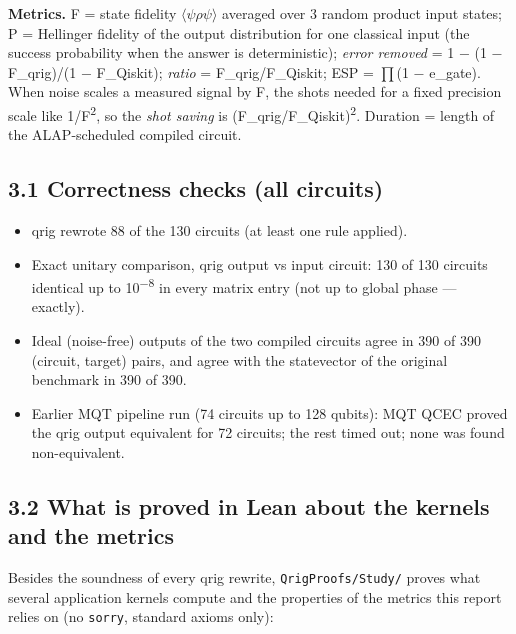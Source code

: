 \documentclass[
  10pt,
]{article}
\newcounter{none} %
\providecommand{\tightlist}{%
  \setlength{\itemsep}{0pt}\setlength{\parskip}{0pt}}
\begin{document}
\textbf{Metrics.} F = state fidelity \ensuremath{\langle}\ensuremath{\psi}\textbar \ensuremath{\rho}\textbar \ensuremath{\psi}\ensuremath{\rangle} averaged
over 3 random product input states; P = Hellinger fidelity of the output
distribution for one classical input (the success probability when the
answer is deterministic); \emph{error removed} = 1 \ensuremath{-} (1 \ensuremath{-} F\_qrig)/(1 \ensuremath{-}
F\_Qiskit); \emph{ratio} = F\_qrig/F\_Qiskit; ESP = \ensuremath{\prod}(1 \ensuremath{-} e\_gate). When
noise scales a measured signal by F, the shots needed for a fixed
precision scale like 1/F\textsuperscript{2}, so the \emph{shot saving} is
(F\_qrig/F\_Qiskit)\textsuperscript{2}. Duration = length of the ALAP-scheduled compiled
circuit.

\subsection{3.1 Correctness checks (all
circuits)}\label{correctness-checks-all-circuits}

\begin{itemize}
\tightlist
\item
  qrig rewrote 88 of the 130 circuits (at least one rule applied).
\item
  Exact unitary comparison, qrig output vs input circuit: 130 of 130
  circuits identical up to 10\textsuperscript{\ensuremath{-}}\textsuperscript{8} in every matrix entry (not up to global
  phase --- exactly).
\item
  Ideal (noise-free) outputs of the two compiled circuits agree in 390
  of 390 (circuit, target) pairs, and agree with the statevector of the
  original benchmark in 390 of 390.
\item
  Earlier MQT pipeline run (74 circuits up to 128 qubits): MQT QCEC
  proved the qrig output equivalent for 72 circuits; the rest timed out;
  none was found non-equivalent.
\end{itemize}

\subsection{3.2 What is proved in Lean about the kernels and the
metrics}\label{what-is-proved-in-lean-about-the-kernels-and-the-metrics}

Besides the soundness of every qrig rewrite, \texttt{QrigProofs/Study/}
proves what several application kernels compute and the properties of
the metrics this report relies on (no \texttt{sorry}, standard axioms
only):
\end{document}
